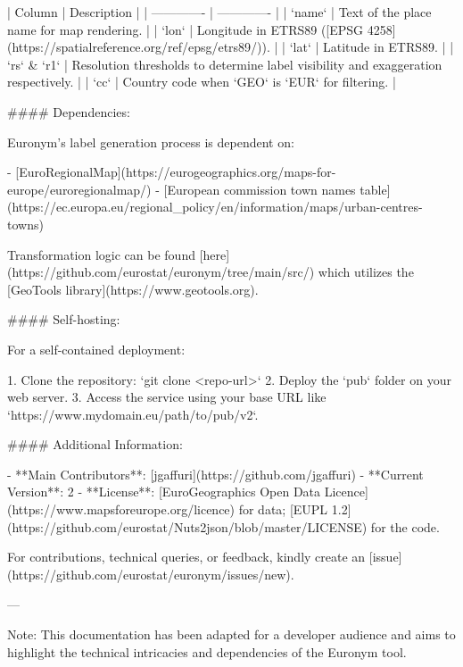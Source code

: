 | Column | Description |
| ------------- | ------------- |
| `name` | Text of the place name for map rendering. |
| `lon` | Longitude in ETRS89 ([EPSG 4258](https://spatialreference.org/ref/epsg/etrs89/)). |
| `lat` | Latitude in ETRS89. |
| `rs` & `r1` | Resolution thresholds to determine label visibility and exaggeration respectively. |
| `cc` | Country code when `GEO` is `EUR` for filtering. |

#### Dependencies:

Euronym's label generation process is dependent on:

- [EuroRegionalMap](https://eurogeographics.org/maps-for-europe/euroregionalmap/)
- [European commission town names table](https://ec.europa.eu/regional_policy/en/information/maps/urban-centres-towns)

Transformation logic can be found [here](https://github.com/eurostat/euronym/tree/main/src/) which utilizes the [GeoTools library](https://www.geotools.org).

#### Self-hosting:

For a self-contained deployment:

1. Clone the repository: `git clone <repo-url>`
2. Deploy the `pub` folder on your web server.
3. Access the service using your base URL like `https://www.mydomain.eu/path/to/pub/v2`.

#### Additional Information:

- **Main Contributors**: [jgaffuri](https://github.com/jgaffuri)
- **Current Version**: 2
- **License**: [EuroGeographics Open Data Licence](https://www.mapsforeurope.org/licence) for data; [EUPL 1.2](https://github.com/eurostat/Nuts2json/blob/master/LICENSE) for the code.

For contributions, technical queries, or feedback, kindly create an [issue](https://github.com/eurostat/euronym/issues/new).

---

Note: This documentation has been adapted for a developer audience and aims to highlight the technical intricacies and dependencies of the Euronym tool.